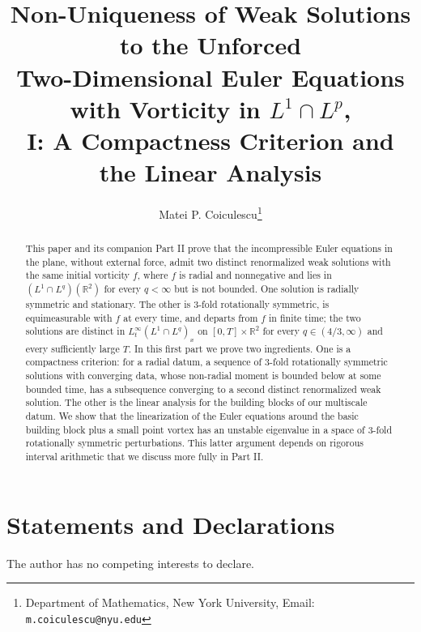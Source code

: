 \documentclass[11pt]{article}
\title{Non-Uniqueness of Weak Solutions to the Unforced\\
Two-Dimensional Euler Equations\\ with Vorticity in $L^1\cap L^p$,\\
I: A Compactness Criterion and the Linear Analysis}
\author{Matei P. Coiculescu\thanks{
Department of Mathematics, New York University,
Email: \texttt{m.coiculescu@nyu.edu}
}}
\theoremstyle{remark}
\begin{document}
\maketitle

\begin{abstract}
This paper and its companion Part II prove that the incompressible Euler
equations in the plane, without external force, admit two distinct renormalized
weak solutions with the same initial vorticity $f$, where $f$ is radial and
nonnegative and lies in $(L^1\cap L^q)(\mathbb{R}^2)$ for every $q<\infty$ but is
not bounded. One solution is radially symmetric and stationary. The other is
$3$-fold rotationally symmetric, is equimeasurable with $f$ at every time, and
departs from $f$ in finite time; the two solutions are distinct in
$L^\infty_t(L^1\cap L^q)_x$ on $[0,T]\times\mathbb{R}^2$ for every $q\in(4/3,\infty)$
and every sufficiently large $T$. In this first part we prove two ingredients. One is a
compactness criterion: for a radial datum, a sequence of $3$-fold rotationally
symmetric solutions with converging data, whose non-radial moment is bounded
below at some bounded time, has a subsequence converging to a second distinct
renormalized weak solution. The other is the linear analysis for the building
blocks of our multiscale datum. We show that the linearization of the Euler
equations around the basic building block plus a small point vortex has an
unstable eigenvalue in a space of $3$-fold rotationally symmetric
perturbations. This latter argument depends on rigorous interval arithmetic
that we discuss more fully in Part II.
\end{abstract}






\section*{Statements and Declarations}
The author has no competing interests to declare.


\end{document}

